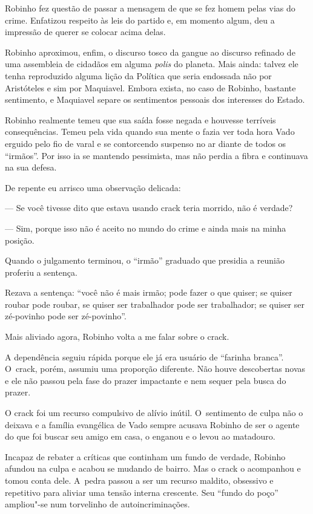 Robinho fez questão de passar a mensagem de que se fez homem pelas vias
do crime. Enfatizou respeito às leis do partido e, em momento algum, deu
a impressão de querer se colocar acima delas.

Robinho aproximou, enfim, o discurso tosco da gangue ao discurso
refinado de uma assembleia de cidadãos em alguma \emph{polis} do
planeta. Mais ainda: talvez ele tenha reproduzido alguma lição da
Política que seria endossada não por Aristóteles e sim por Maquiavel.
Embora exista, no caso de Robinho, bastante sentimento, e Maquiavel
separe os sentimentos pessoais dos interesses do Estado.

\asterisc

Robinho realmente temeu que sua saída fosse negada e houvesse terríveis
consequências. Temeu pela vida quando sua mente o fazia ver toda hora
Vado erguido pelo fio de varal e se contorcendo suspenso no ar diante
de todos os ``irmãos''. Por isso ia se mantendo pessimista, mas não
perdia a fibra e continuava na sua defesa.

De repente eu arrisco uma observação delicada:

— Se você tivesse dito que estava usando crack teria morrido, não é
verdade?

— Sim, porque isso não é aceito no mundo do crime e ainda mais na minha
posição.

\asterisc{}

Quando o julgamento terminou, o ``irmão'' graduado que presidia a
reunião proferiu a sentença.

Rezava a sentença: ``você não é mais irmão; pode fazer o que quiser; se
quiser roubar pode roubar, se quiser ser trabalhador pode ser
trabalhador; se quiser ser zé-povinho pode ser zé-povinho''.

\asterisc{}

Mais aliviado agora, Robinho volta a me falar sobre o crack.

A dependência seguiu rápida porque ele já era usuário de ``farinha
branca''. O~crack, porém, assumiu uma proporção diferente. Não houve
descobertas novas e ele não passou pela fase do prazer impactante e nem
sequer pela busca do prazer.

O crack foi um recurso compulsivo de alívio inútil. O~sentimento de
culpa não o deixava e a família evangélica de Vado sempre acusava
Robinho de ser o agente do  que foi buscar seu amigo em casa, o
enganou e o levou ao matadouro.

Incapaz de rebater a críticas que continham um fundo de verdade,
Robinho afundou na culpa e acabou se mudando de bairro. Mas o crack o
acompanhou e tomou conta dele. A~pedra passou a ser um recurso maldito,
obsessivo e repetitivo para aliviar uma tensão interna crescente. Seu
``fundo do poço'' ampliou"-se num torvelinho de autoincriminações.

